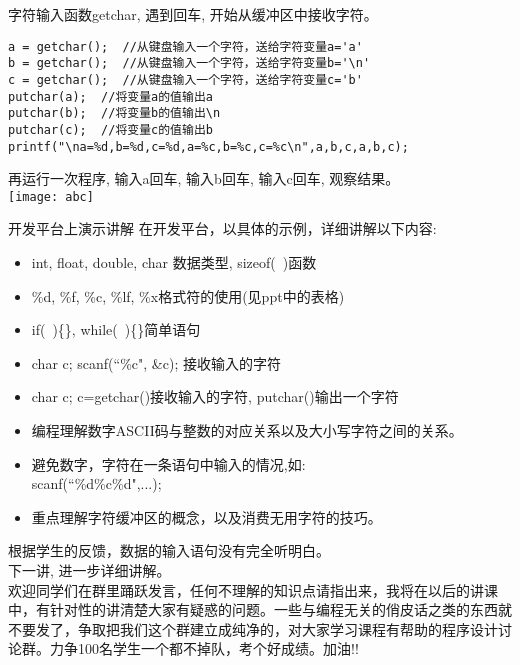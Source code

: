 \begin{frame}[fragile]{\small 字符输入函数getchar, 遇到回车, 开始从缓冲区中接收字符。}
\begin{lstlisting}
a = getchar();  //从键盘输入一个字符，送给字符变量a='a'
b = getchar();  //从键盘输入一个字符，送给字符变量b='\n'
c = getchar();  //从键盘输入一个字符，送给字符变量c='b'
putchar(a);  //将变量a的值输出a
putchar(b);  //将变量b的值输出\n 
putchar(c);  //将变量c的值输出b
printf("\na=%d,b=%d,c=%d,a=%c,b=%c,c=%c\n",a,b,c,a,b,c);
\end{lstlisting}
再运行一次程序, 输入a回车, 输入b回车, 输入c回车, 观察结果。\\
\texttt{[image: abc]}
\end{frame}

\begin{frame}{开发平台上演示讲解}
在开发平台，以具体的示例，详细讲解以下内容:
\begin{itemize}
	\item int, float, double, char 数据类型, sizeof(~)函数
	\item \%d, \%f, \%c, \%lf, \%x格式符的使用(见ppt中的表格)
	\item if(~)\{\quad\}, while(~)\{\quad\}简单语句
	\item char c; scanf(``\%c", \&c); 接收输入的字符
	\item char c; c=getchar()接收输入的字符, putchar()输出一个字符
	\item 编程理解数字ASCII码与整数的对应关系以及大小写字符之间的关系。
	\item 避免数字，字符在一条语句中输入的情况,如:\\ scanf(``\%d\%c\%d",...);
	\item 重点理解字符缓冲区的概念，以及消费无用字符的技巧。
\end{itemize}
\end{frame}

\note
{
根据学生的反馈，数据的输入语句没有完全听明白。 \\
下一讲, 进一步详细讲解。\\
欢迎同学们在群里踊跃发言，任何不理解的知识点请指出来，我将在以后的讲课中，有针对性的讲清楚大家有疑惑的问题。一些与编程无关的俏皮话之类的东西就不要发了，争取把我们这个群建立成纯净的，对大家学习课程有帮助的程序设计讨论群。力争100名学生一个都不掉队，考个好成绩。加油!!
}



